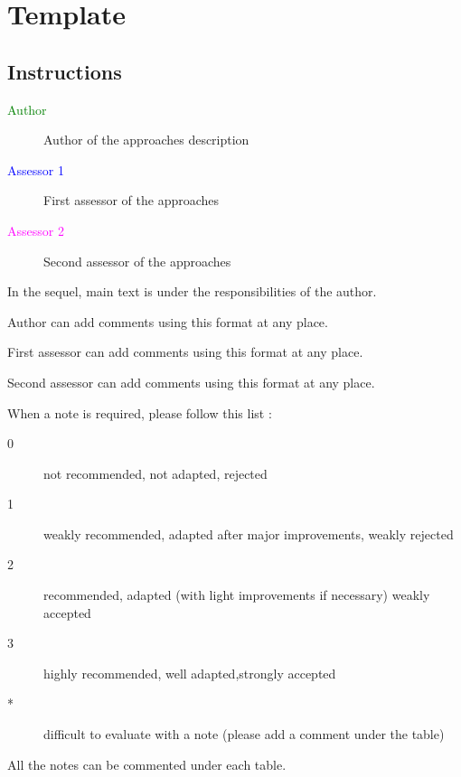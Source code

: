 \chapter{Template}
\label{sec:template}

\section{Instructions}

\begin{description}
\item[\textcolor{green}{Author}] Author of the approaches description  
\item[\textcolor{blue}{Assessor 1}] First assessor of the approaches 
\item[\textcolor{magenta}{Assessor 2}] Second assessor of the approaches 
\end{description}

In the sequel, main text is under the responsibilities of the author.

\begin{author_comment}
Author can add comments using this format at any place.
\end{author_comment}

\begin{assessor1}
First assessor can add comments using this format at any place.
\end{assessor1}

\begin{assessor2}
Second assessor can add comments using this format at any place.
\end{assessor2}

When a note is required, please follow this list :
\begin{description}
\item[0] not recommended, not adapted, rejected
\item[1] weakly recommended, adapted after major improvements, weakly rejected
\item[2] recommended, adapted (with light improvements if necessary)  weakly accepted
\item[3] highly recommended, well adapted,strongly accepted
\item[*] difficult to evaluate with a note (please add a comment under the table)
\end{description}

All the notes can be commented under each table.

